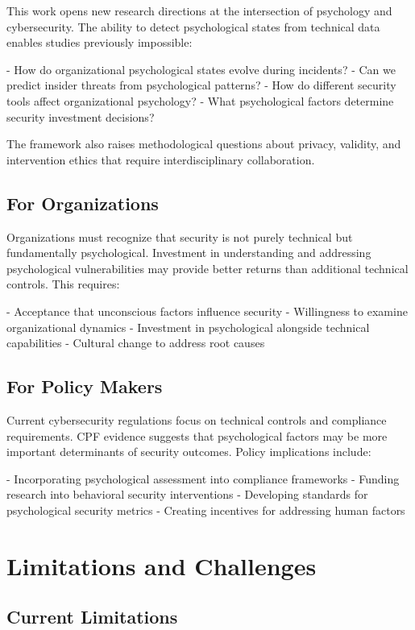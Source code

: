\documentclass[11pt,a4paper]{article}
\begin{document}
This work opens new research directions at the intersection of psychology and cybersecurity. The ability to detect psychological states from technical data enables studies previously impossible:

- How do organizational psychological states evolve during incidents?
- Can we predict insider threats from psychological patterns?
- How do different security tools affect organizational psychology?
- What psychological factors determine security investment decisions?

The framework also raises methodological questions about privacy, validity, and intervention ethics that require interdisciplinary collaboration.

\subsection{For Organizations}

Organizations must recognize that security is not purely technical but fundamentally psychological. Investment in understanding and addressing psychological vulnerabilities may provide better returns than additional technical controls. This requires:

- Acceptance that unconscious factors influence security
- Willingness to examine organizational dynamics
- Investment in psychological alongside technical capabilities
- Cultural change to address root causes

\subsection{For Policy Makers}

Current cybersecurity regulations focus on technical controls and compliance requirements. CPF evidence suggests that psychological factors may be more important determinants of security outcomes. Policy implications include:

- Incorporating psychological assessment into compliance frameworks
- Funding research into behavioral security interventions
- Developing standards for psychological security metrics
- Creating incentives for addressing human factors

\section{Limitations and Challenges}

\subsection{Current Limitations}
\end{document}
